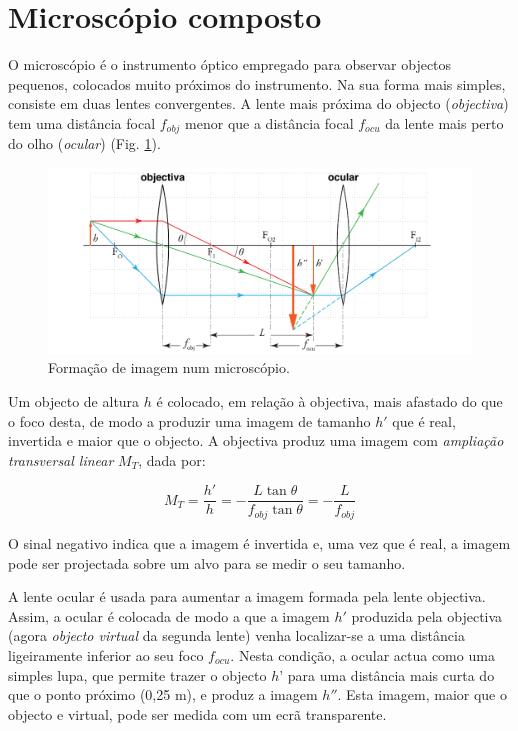 \documentclass[a4paper,12pt]{article}      %
\begin{document}
\section{\sf Microscópio composto}

O microscópio é o instrumento óptico empregado para observar objectos pequenos, colocados muito próximos do instrumento. Na sua forma mais simples, consiste em duas lentes convergentes. A lente mais próxima do objecto (\emph{objectiva}) tem uma distância focal $f_{obj}$ menor que a distância focal $f_{ocu}$ da lente mais perto do olho (\emph{ocular}) (Fig. \ref{fig:microscopio}).

\begin{figure}
	[!htb]  \centering 
	\includegraphics[width=1.0\textwidth]{microscopio}
		\caption{Formação de imagem num microscópio. \label{fig:microscopio}} 
\end{figure}

Um objecto de altura $h$ é colocado, em relação à objectiva, mais afastado do que o foco desta, de modo a produzir uma imagem de tamanho $h'$ que é real, invertida e maior que o objecto. A objectiva produz uma imagem com \emph{ampliação transversal linear} $M_T$, dada por:

\begin{equation}
M_T=\frac{h'}{h} = -\frac{L\tan\theta}{f_{obj}\tan\theta}= -\frac{L}{f_{obj}}
\end{equation}

O sinal negativo indica que a imagem é invertida e, uma vez que é real, a imagem pode ser projectada sobre um alvo para se medir o seu tamanho.

A lente ocular é usada para aumentar a imagem formada pela lente objectiva. Assim, a ocular é colocada de modo a que a imagem $h'$ produzida pela objectiva (agora \emph{objecto virtual} da segunda lente) venha localizar-se a uma distância ligeiramente inferior ao seu foco $f_{ocu}$. Nesta condição, a ocular actua como uma simples lupa, que permite trazer o objecto $h’$ para uma distância mais curta do que o ponto próximo (0,25 m), e produz a imagem $h''$. Esta imagem, maior que o objecto e virtual, pode ser medida com um ecrã transparente.
\end{document}
